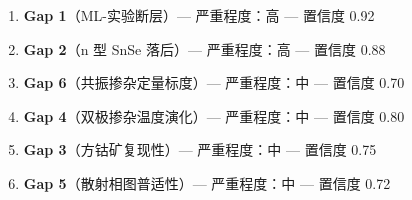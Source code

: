 \documentclass[12pt,a4paper]{ctexart}
\providecommand{\tightlist}{%
  \setlength{\itemsep}{0pt}\setlength{\parskip}{0pt}}
\begin{document}
\begin{enumerate}
\def\labelenumi{\arabic{enumi}.}
\tightlist
\item
  \textbf{Gap 1}（ML-实验断层）--- 严重程度：高 --- 置信度 0.92
\item
  \textbf{Gap 2}（n 型 SnSe 落后）--- 严重程度：高 --- 置信度 0.88
\item
  \textbf{Gap 6}（共振掺杂定量标度）--- 严重程度：中 --- 置信度 0.70
\item
  \textbf{Gap 4}（双极掺杂温度演化）--- 严重程度：中 --- 置信度 0.80
\item
  \textbf{Gap 3}（方钴矿复现性）--- 严重程度：中 --- 置信度 0.75
\item
  \textbf{Gap 5}（散射相图普适性）--- 严重程度：中 --- 置信度 0.72
\end{enumerate}

\printbibliography[title=参考文献]
\end{document}

